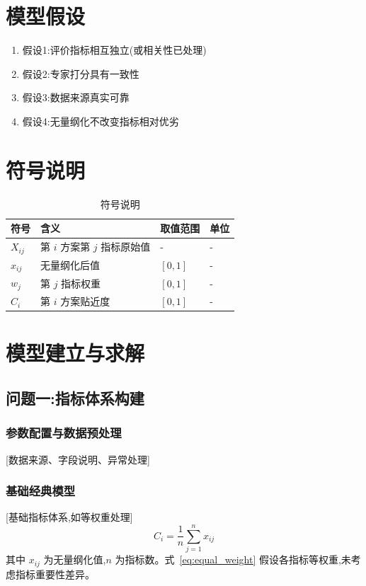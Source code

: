 \documentclass[12pt,a4paper]{ctexart}
\begin{document}
\section{模型假设}
\begin{enumerate}
  \item 假设1:评价指标相互独立(或相关性已处理)
  \item 假设2:专家打分具有一致性
  \item 假设3:数据来源真实可靠
  \item 假设4:无量纲化不改变指标相对优劣
\end{enumerate}

\section{符号说明}
\begin{table}[H]
\centering
\caption{符号说明}
\label{tab:symbols}
\begin{tabular}{llll}
\toprule
符号 & 含义 & 取值范围 & 单位 \\
\midrule
$X_{ij}$ & 第 $i$ 方案第 $j$ 指标原始值 & - & - \\
$x_{ij}$ & 无量纲化后值 & $[0, 1]$ & - \\
$w_j$ & 第 $j$ 指标权重 & $[0, 1]$ & - \\
$C_i$ & 第 $i$ 方案贴近度 & $[0, 1]$ & - \\
\bottomrule
\end{tabular}
\end{table}

\section{模型建立与求解}

\subsection{问题一:指标体系构建}

\subsubsection{参数配置与数据预处理}
[数据来源、字段说明、异常处理]

\subsubsection{基础经典模型}
[基础指标体系,如等权重处理]
\begin{equation}
C_i = \frac{1}{n} \sum_{j=1}^{n} x_{ij}
\label{eq:equal_weight}
\end{equation}
其中 $x_{ij}$ 为无量纲化值,$n$ 为指标数。式~\eqref{eq:equal_weight} 假设各指标等权重,未考虑指标重要性差异。
\end{document}
